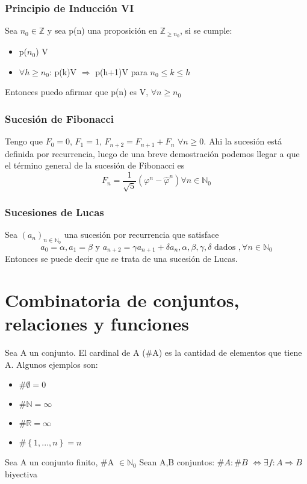 \documentclass{article}
\newcommand{\card}[1]{\##1}
\begin{document}
\subsubsection{Principio de Inducción VI}
Sea $n_0 \in \mathbb{Z}$ y sea p(n) una proposición en $\mathbb{Z}_{\geq n_0}$, si se cumple:
\begin{itemize}
    \item p($n_0$) V
    \item $\forall h \geq n_0$: p(k)V $\Rightarrow$ p(h+1)V para $n_0 \leq k \leq h$
\end{itemize}
Entonces puedo afirmar que p(n) es V, $\forall n \geq n_0$

\subsubsection{Sucesión de Fibonacci}
Tengo que $F_0 = 0$, $F_1 = 1$, $F_{n+2} = F_{n+1} + F_{n}$ $\forall n \geq 0$. Ahi la sucesión está definida por recurrencia, luego de una breve demostración podemos llegar a que el término general de la sucesión de Fibonacci es
\begin{equation}
    F_n = \frac{1}{\sqrt{5}}(\varphi^n - \hat{\varphi}^n) \forall n \in \mathbb{N}_0
\end{equation}

\subsubsection{Sucesiones de Lucas}
Sea $(a_n)_{n \in \mathbb{N}_0}$ una sucesión por recurrencia que satisface
\begin{equation}
    a_0 = \alpha, a_1 = \beta \text{ y } a_{n+2} = \gamma a_{n+1} + \delta a_n, \alpha,\beta,\gamma,\delta \text{ dados }, \forall n \in \mathbb{N}_0 
\end{equation}
Entonces se puede decir que se trata de una sucesión de Lucas.

\section{Combinatoria de conjuntos, relaciones y funciones}
Sea A un conjunto. El cardinal de A (#A) es la cantidad de elementos que tiene A. Algunos ejemplos son: \begin{itemize}
        \item $\card{\emptyset} = 0$
        \item $\card{\mathbb{N}} = \infty$
        \item $\card{\mathbb{R}} = \infty$
        \item $\card{\left\{1,...,n\right\}}=n$
\end{itemize}
Sea A un conjunto finito, #A $\in \mathbb{N}_0$
Sean A,B conjuntos: $\card{A}:\card{B}$ $\iff \exists f:A \Rightarrow B$ biyectiva
\end{document}

